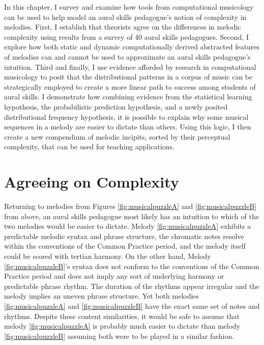 \documentclass[12pt,]{book}
\begin{document}
In this chapter, I survey and examine how tools from computational musicology can be used to help model an aural skills pedagogue's notion of complexity in melodies.
First, I establish that theorists agree on the differences in melodic complexity using results from a survey of 40 aural skills pedagogues.
Second, I explore how both static and dynamic computationally derived abstracted features of melodies can and cannot be used to approximate an aural skills pedagogue's intuition.
Third and finally, I use evidence afforded by research in computational musicology to posit that the distributional patterns in a corpus of music can be strategically employed to create a more linear path to success among students of aural skills.
I demonstrate how combining evidence from the statistical learning hypothesis, the probabilistic prediction hypothesis, and a newly posited distributional frequency hypothesis, it is possible to explain why some musical sequences in a melody are easier to dictate than others.
Using this logic, I then create a new compendium of melodic incipits, sorted by their perceptual complexity, that can be used for teaching applications.

\hypertarget{agreeing-on-complexity}{%
\section{Agreeing on Complexity}\label{agreeing-on-complexity}}

Returning to melodies from Figures \ref{fig:musicalpuzzleA} and \ref{fig:musicalpuzzleB} from above, an aural skills pedagogue most likely has an intuition to which of the two melodies would be easier to dictate.
Melody \ref{fig:musicalpuzzleA} exhibits a predictable melodic syntax and phrase structure, the chromatic notes resolve within the conventions of the Common Practice period, and the melody itself could be scored with tertian harmony.
On the other hand, Melody \ref{fig:musicalpuzzleB}'s syntax does not conform to the conventions of the Common Practice period and does not imply any sort of underlying harmony or predictable phrase rhythm.
The duration of the rhythms appear irregular and the melody implies an uneven phrase structure.
Yet both melodies \ref{fig:musicalpuzzleA} and \ref{fig:musicalpuzzleB} have the exact same set of notes and rhythms.
Despite these content similarities, it would be safe to assume that melody \ref{fig:musicalpuzzleA} is probably much easier to dictate than melody \ref{fig:musicalpuzzleB} assuming both were to be played in a similar fashion.
\end{document}

